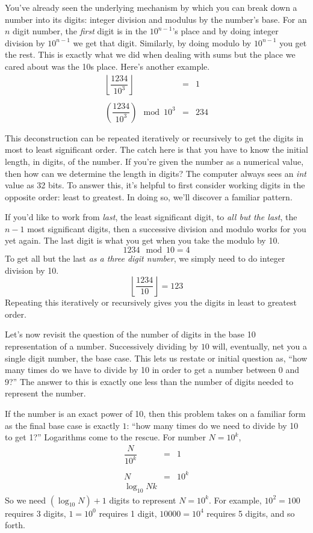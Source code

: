 \documentclass[10pt]{article}
\begin{document}
You've already seen the underlying mechanism by which you can break down a number into its digits: integer division and modulus by the number's base. For an $n$ digit number, the \textit{first} digit is in the $10^{n-1}$'s place and by doing integer division by $10^{n-1}$ we get that digit.  Similarly, by doing modulo by $10^{n-1}$ you get the rest.  This is exactly what we did when dealing with sums but the place we cared about was the 10s place. Here's another example. 
\[
\begin{array}{rcl}
\left\lfloor \dfrac{1234}{10^3} \right\rfloor &=& 1 \\ \\
\left( \dfrac{1234}{10^3} \right) \mod 10^3 &=& 234 \\ \\
\end{array}
\]
This deconstruction can be repeated iteratively or recursively to get the digits in most to least significant order. The catch here is that you have to know the initial length, in digits, of the number. If you're given the number as a numerical value, then how can we determine the length in digits? The computer always sees an \textit{int} value as 32 bits. To answer this, it's helpful to first consider working digits in the opposite order: least to greatest. In doing so, we'll discover a familiar pattern. 

If you'd like to work from \textit{last}, the least significant digit, to \textit{all but the last}, the $n-1$ most significant digits, then a successive division and modulo works for you yet again. The last digit is what you get when you take the modulo by 10.
\[
1234 \mod 10 = 4
\]
To get all but the last \textit{as a three digit number}, we simply need to do integer division  by 10.
\[
\left\lfloor \dfrac{1234}{10} \right\rfloor = 123
\]
Repeating this iteratively or recursively gives you the digits in least to greatest order.

Let's now revisit the question of the number of digits in the base 10 representation of a number. Successively dividing by $10$ will, eventually, net you a single digit number, the base case. This lets us restate or initial question as, ``how many times do we have to divide by 10 in order to get a number between 0 and 9?'' The answer to this is exactly one less than the number of digits needed to represent the number. 

If the number is an exact power of 10, then this problem takes on a familiar form as the final base case is exactly $1$:  ``how many times do we need to divide by 10 to get 1?'' Logarithms come to the rescue. For number $N = 10^k$, 
\[
\begin{array}{rcl}
\dfrac{N}{10^k} &=& 1 \\ \\
N &=& 10^k \\ 
\log_{10} N k
\end{array}
\]
So we need $(\log_{10} N) + 1$ digits to represent $N = 10^k$.  For example, $10^2 = 100$ requires 3 digits, $1 = 10^0$ requires 1 digit, $10000 = 10^4$ requires 5 digits, and so forth. 
\end{document}
